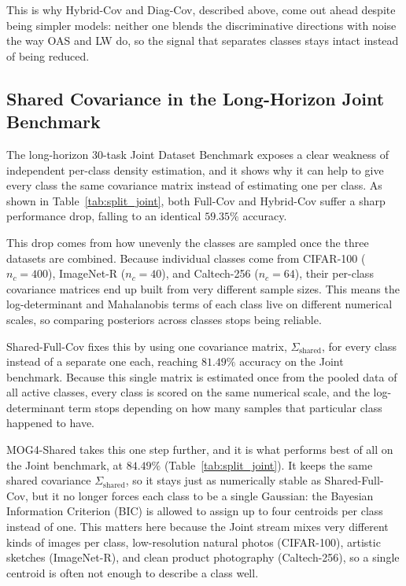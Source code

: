 This is why Hybrid-Cov and Diag-Cov, described above, come out ahead despite being simpler models: neither one blends the discriminative directions with noise the way OAS and LW do, so the signal that separates classes stays intact instead of being reduced.

\subsection{Shared Covariance in the Long-Horizon Joint Benchmark}
\label{sec:an:homoscedasticity}
\label{sec:an:shared_covariances}

The long-horizon 30-task Joint Dataset Benchmark exposes a clear weakness of independent per-class density estimation, and it shows why it can help to give every class the same covariance matrix instead of estimating one per class. As shown in Table~\ref{tab:split_joint}, both Full-Cov and Hybrid-Cov suffer a sharp performance drop, falling to an identical $59.35\%$ accuracy.

This drop comes from how unevenly the classes are sampled once the three datasets are combined. Because individual classes come from CIFAR-100 ($n_c=400$), ImageNet-R ($n_c=40$), and Caltech-256 ($n_c=64$), their per-class covariance matrices end up built from very different sample sizes. This means the log-determinant and Mahalanobis terms of each class live on different numerical scales, so comparing posteriors across classes stops being reliable.

Shared-Full-Cov fixes this by using one covariance matrix, $\Sigma_{\text{shared}}$, for every class instead of a separate one each, reaching $81.49\%$ accuracy on the Joint benchmark. Because this single matrix is estimated once from the pooled data of all active classes, every class is scored on the same numerical scale, and the log-determinant term stops depending on how many samples that particular class happened to have.

MOG4-Shared takes this one step further, and it is what performs best of all on the Joint benchmark, at $84.49\%$ (Table~\ref{tab:split_joint}). It keeps the same shared covariance $\Sigma_{\text{shared}}$, so it stays just as numerically stable as Shared-Full-Cov, but it no longer forces each class to be a single Gaussian: the Bayesian Information Criterion (BIC) is allowed to assign up to four centroids per class instead of one. This matters here because the Joint stream mixes very different kinds of images per class, low-resolution natural photos (CIFAR-100), artistic sketches (ImageNet-R), and clean product photography (Caltech-256), so a single centroid is often not enough to describe a class well. 

